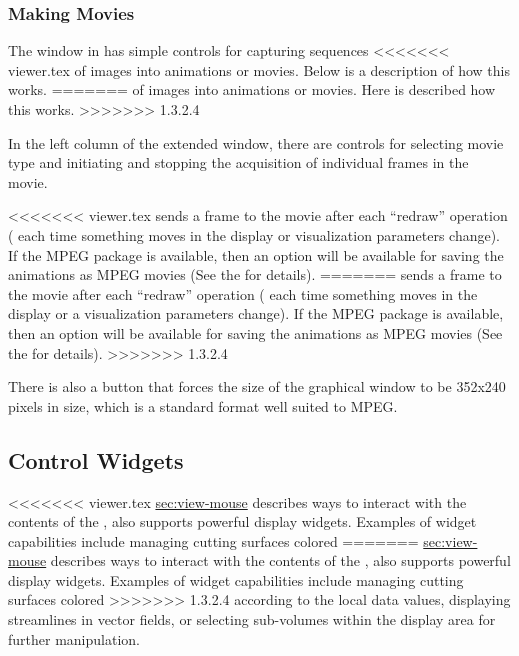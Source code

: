 \subsubsection{Making Movies}
\label{sec:view-movies} 

The \viewer{} window in \SR{} has simple controls for capturing sequences
<<<<<<< viewer.tex
of images into animations or movies.  Below is a description of how this works.
=======
of images into animations or movies.  Here is described how this works.
>>>>>>> 1.3.2.4

In the left column of the extended \viewer{} window, there are controls for
selecting movie type and initiating and stopping the acquisition of
individual frames in the movie.

<<<<<<< viewer.tex
\SR{} sends a frame to the movie after each ``redraw'' operation ( \ie{}
each time something moves in the display or visualization parameters
change).  If the MPEG package is available, then an option will be available for saving the animations as MPEG movies (See the
 for details).
=======
\SR{} sends a frame to the movie after each ``redraw'' operation ( \ie{}
each time something moves in the display or a visualization parameters
change).  If the MPEG package is available, then an option will be available for saving the animations as MPEG movies (See the
 for details).
>>>>>>> 1.3.2.4

There is also a button that forces the size of the graphical window to be
352x240 pixels in size, which is a standard format well suited to MPEG.

\subsection{Control Widgets}
\label{sec:view-widgets} 

<<<<<<< viewer.tex
\hyperref{Mouse controls}{Mouse controls in
Section}{}{sec:view-mouse} describes ways to interact with the contents
of the \viewer{}, \SR{} also supports  powerful display widgets.
Examples of widget capabilities include managing cutting surfaces colored
=======
\hyperref{Mouse controls}{mouse controls in
Section}{}{sec:view-mouse} describes ways to interact with the contents
of the \viewer{}, \SR{} also supports  powerful display widgets.
Examples of widget capabilities include managing cutting surfaces colored
>>>>>>> 1.3.2.4
according to the local data values, displaying streamlines in vector
fields, or selecting sub-volumes within the display area for further
manipulation. 
 
